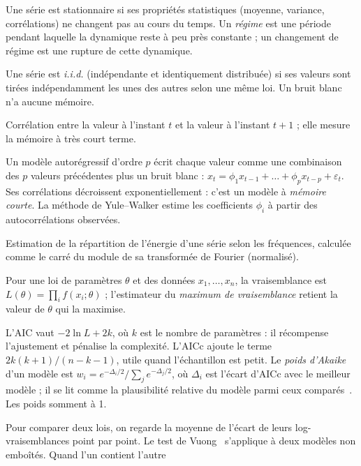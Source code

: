 \documentclass[11pt,a4paper]{article}
\renewcommand{\_}{\textunderscore\penalty0\hspace{0pt}}
\begin{document}
\begin{description}[style=nextline,leftmargin=1.2em,itemsep=4pt]
\item[Stationnarité.] Une série est stationnaire si ses propriétés statistiques (moyenne,
variance, corrélations) ne changent pas au cours du temps. Un \emph{régime} est une période
pendant laquelle la dynamique reste à peu près constante ; un changement de régime est une
rupture de cette dynamique.
\item[Bruit blanc, i.i.d.] Une série est \emph{i.i.d.} (indépendante et identiquement
distribuée) si ses valeurs sont tirées indépendamment les unes des autres selon une même
loi. Un bruit blanc n'a aucune mémoire.
\item[Autocorrélation $\rho_1$.] Corrélation entre la valeur à l'instant $t$ et la valeur à
l'instant $t+1$ ; elle mesure la mémoire à très court terme.
\item[Modèle AR($p$).] Un modèle autorégressif d'ordre $p$ écrit chaque valeur comme une
combinaison des $p$ valeurs précédentes plus un bruit blanc :
$x_t=\phi_1x_{t-1}+\dots+\phi_px_{t-p}+\varepsilon_t$. Ses corrélations décroissent
exponentiellement : c'est un modèle à \emph{mémoire courte}. La méthode de Yule--Walker
estime les coefficients $\phi_i$ à partir des autocorrélations observées.
\item[Périodogramme.] Estimation de la répartition de l'énergie d'une série selon les
fréquences, calculée comme le carré du module de sa transformée de Fourier (normalisé).
\item[Vraisemblance.] Pour une loi de paramètres $\theta$ et des données $x_1,\dots,x_n$,
la vraisemblance est $L(\theta)=\prod_i f(x_i;\theta)$ ; l'estimateur du \emph{maximum de
vraisemblance} retient la valeur de $\theta$ qui la maximise.
\item[AIC, AICc, poids d'Akaike.] L'AIC vaut $-2\ln L+2k$, où $k$ est le nombre de
paramètres : il récompense l'ajustement et pénalise la complexité. L'AICc ajoute le terme
$2k(k+1)/(n-k-1)$, utile quand l'échantillon est petit. Le \emph{poids d'Akaike} d'un
modèle est $w_i=e^{-\Delta_i/2}/\sum_j e^{-\Delta_j/2}$, où $\Delta_i$ est l'écart d'AICc
avec le meilleur modèle ; il se lit comme la plausibilité relative du modèle parmi ceux
comparés~\cite{burnham2002}. Les poids somment à 1.
\item[Test de Vuong, rapport de vraisemblance.] Pour comparer deux lois, on regarde la
moyenne de l'écart de leurs log-vraisemblances point par point. Le test de
Vuong~\cite{vuong1989} s'applique à deux modèles non emboîtés. Quand l'un contient l'autre

\end{description}
\end{document}
